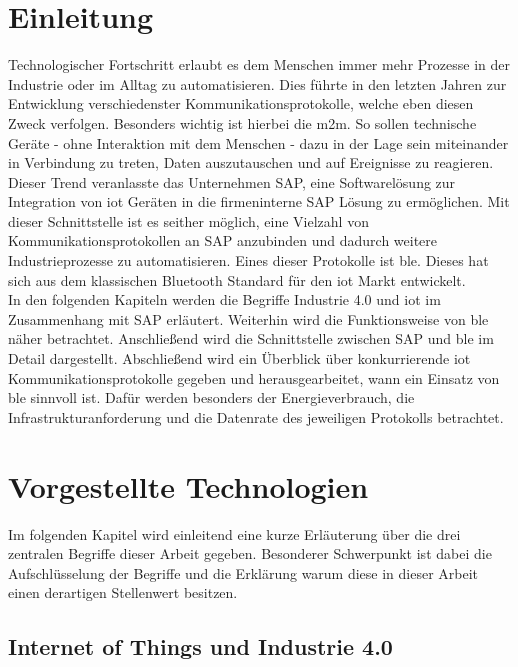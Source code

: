\section{Einleitung}
\label{s:intro}

\noindent Technologischer Fortschritt erlaubt es dem Menschen immer mehr Prozesse in der Industrie oder im Alltag zu automatisieren. Dies führte in den letzten Jahren zur Entwicklung verschiedenster Kommunikationsprotokolle, welche eben diesen Zweck verfolgen. Besonders wichtig ist hierbei die \ac{m2m}. So sollen technische Geräte - ohne Interaktion mit dem Menschen - dazu in der Lage sein miteinander in Verbindung zu treten, Daten auszutauschen und auf Ereignisse zu reagieren.\\
\noindent Dieser Trend veranlasste das Unternehmen SAP, eine Softwarelösung zur Integration von \ac{iot} Geräten in die firmeninterne SAP Lösung zu ermöglichen. Mit dieser Schnittstelle ist es seither möglich, eine Vielzahl von Kommunikationsprotokollen an SAP anzubinden und dadurch weitere Industrieprozesse zu automatisieren. Eines dieser Protokolle ist \ac{ble}. Dieses hat sich aus dem klassischen Bluetooth Standard für den \ac{iot} Markt entwickelt.\\
\noindent In den folgenden Kapiteln werden die Begriffe Industrie 4.0 und \ac{iot} im Zusammenhang mit SAP erläutert. Weiterhin wird die Funktionsweise von \ac{ble} näher betrachtet. Anschließend wird die Schnittstelle zwischen SAP und \ac{ble} im Detail dargestellt. Abschließend wird ein Überblick über konkurrierende \ac{iot} Kommunikationsprotokolle gegeben und herausgearbeitet, wann ein Einsatz von \ac{ble} sinnvoll ist. Dafür werden besonders der Energieverbrauch, die Infrastrukturanforderung und die Datenrate des jeweiligen Protokolls betrachtet.\\     

\section{Vorgestellte Technologien}
\label{s:grundlagen}

\noindent Im folgenden Kapitel wird einleitend eine kurze Erläuterung über die drei zentralen Begriffe dieser Arbeit gegeben. Besonderer Schwerpunkt ist dabei die Aufschlüsselung der Begriffe und die Erklärung warum diese in dieser Arbeit einen derartigen Stellenwert besitzen.\\ 

\subsection{Internet of Things und Industrie 4.0}
\label{ss:grundlagen:iot}

